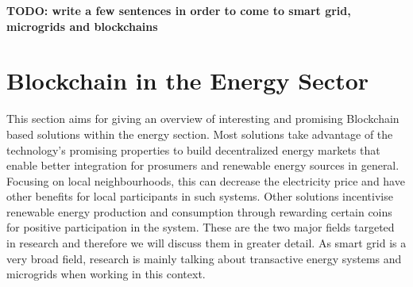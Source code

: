 \documentclass[runningheads]{llncs}
\begin{document}
\textbf{TODO: write a few sentences in order to come to smart grid, microgrids and blockchains}


\section{Blockchain in the Energy Sector}
This section aims for giving an overview of interesting and promising Blockchain based solutions within the energy section. Most solutions take advantage of the technology's promising properties to build decentralized energy markets that enable better integration for prosumers and renewable energy sources in general. Focusing on local neighbourhoods, this can decrease the electricity price and have other benefits for local participants in such systems. Other solutions incentivise renewable energy production and consumption through rewarding certain coins for positive participation in the system. These are the two major fields targeted in research and therefore we will discuss them in greater detail. As smart grid is a very broad field, research is mainly talking about transactive energy systems and microgrids when working in this context.
\end{document}
